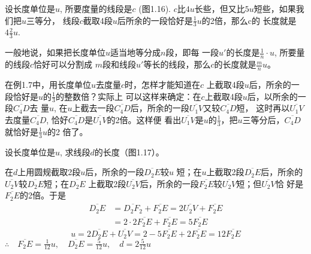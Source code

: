 \begin{example}
	设长度单位是$u$, 所要度量的线段是$c$ (图1.16). $c$比$4u$长些，但又比$5u$短些，如果我们把$u$三等分，
	线段$c$截取4段$u$后所余的一段恰好是$\frac{1}{3}u$的2倍，那么c的
	长度就是$4\frac{2}{3}u$.

\begin{figure}[htp]
	\centering
{}
	\caption{}
\end{figure}

一般地说，如果把长度单位$u$适当地等分成$n$段，即每
一段$u'$的长度是$\frac{1}{n}\cdot u$, 所要量的线段$c$恰好可以分割成
$m$段和线段$u'$等长的线段，那么$c$的长度就是$\frac{m}{n}u$。

在例1.7中，用长度单位$u$去度量$c$时，怎样才能知道在$c$
上截取4段$u$后，所余的一段恰好是$u$的$\frac{1}{3}$的整数倍？实际上
可以这样来确定：在$c$上截取4段$u$后，以所余的一段$\overline{C_4D}$去
量$u$, 在$u$上截去一段$\overline{C_4D}$后，所余的一段$\overline{U_1V}$又较$\overline{C_4D}$短，
这时再以$\overline{U_1V}$去度量$\overline{C_4D}$, 恰好$\overline{C_4D}$是$\overline{U_1V}$的2倍。这样便
看出$\overline{U_1V}$是$u$的$\frac{1}{3}$，把$u$三等分后，$\overline{C_4D}$就恰好是$\frac{1}{3}u$的2
倍了。
\end{example}

\begin{example}
	设长度单位是$u$, 求线段$d$的长度（图1.17）。
\begin{figure}[htp]
	\centering
{}	
	\caption{}
\end{figure}
\end{example}

\begin{solution}
	在$d$上用圆规截取2段$u$后，所余的一段$\overline{D_2E}$较$u$
短；在$u$上截取2段$\overline{D_2E}$后，所余的$\overline{U_2V}$较$\overline{D_2E}$短；在$\overline{D_2E}$
上截取2段$\overline{U_2V}$后，所余的一段$\overline{F_2E}$较$\overline{U_2V}$短；但$\overline{U_2V}$恰
好是$\overline{F_2E}$的2倍。于是
\[\begin{split}
	\overline{D_2E}&=\overline{D_2F_2}+\overline{F_2E}=2\overline{U_2V}+\overline{F_2E}\\
&=2\cdot 2\overline{F_2E}+\overline{F_2E}=5\overline{F_2E}
\end{split}\]
\[u=2\overline{D_2E}+\overline{U_2V}=2-5\overline{F_2E}+2\overline{F_2E}=12\overline{F_2E}\]
$\therefore\quad \overline{F_2E}=\frac{1}{12}u,\quad \overline{D_2E}=\frac{5}{12}u,\quad d=2\frac{5}{12}u$
\end{solution}


